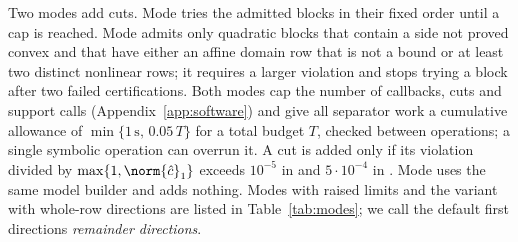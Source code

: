 Two modes add cuts. Mode  tries the admitted blocks in their fixed
order until a cap is reached. Mode  admits only quadratic blocks
that contain a side not proved convex and that have either an affine domain
row that is not a bound or at least two distinct nonlinear rows; it requires
a larger violation and stops trying a block after two failed certifications.
Both modes cap the number of callbacks, cuts and support calls
(Appendix~\ref{app:software}) and give all separator work a cumulative
allowance of $\min\{1\,\mathrm s,\,0.05\,T\}$ for a total budget $T$, checked
between operations; a single symbolic operation can overrun it. A cut is
added only if its violation divided by $\max\{1,\norm{\hat c}_1\}$ exceeds
$10^{-5}$ in  and $5\cdot10^{-4}$ in . Mode
 uses the same model builder and adds nothing. Modes with raised
limits and the variant with whole-row directions are listed in
Table~\ref{tab:modes}; we call the default first directions
\emph{remainder directions}.
